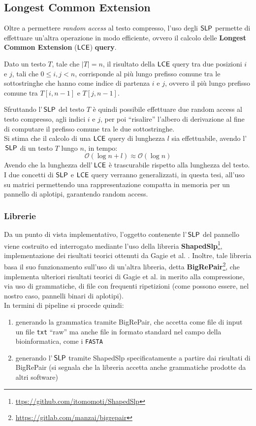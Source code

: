 \subsection{Longest Common Extension}
Oltre a permettere \textit{random access} al testo compresso, 
l'uso degli $\mbox{\rm {\sf SLP}}$ permette di effettuare 
un'altra operazione in modo efficiente, ovvero il calcolo delle \textbf{Longest
  Common Extension} ($\mbox{\rm {\sf LCE}}$) \textbf{query}.
\begin{definizione}
  Dato un testo $T$, tale che $|T|=n$, il risultato della $\mbox{\rm {\sf LCE}}$ query tra
  due posizioni $i$ e $j$, tali che $0\leq i,j<n$, corrisponde al più lungo
  prefisso comune tra le sottostringhe che hanno come indice di partenza $i$ e
  $j$, ovvero il più lungo prefisso comune tra $T[i,n-1]$ e $T[j,n-1]$.
\end{definizione}
Sfruttando l'$\,\mbox{\rm {\sf SLP}}$ del testo $T$ è quindi possibile effettuare due
random access al testo compresso, agli indici $i$ e $j$, per poi ``risalire''
l'albero di derivazione al fine di computare il prefisso comune tra le due
sottostringhe.\\ 
Si stima che il calcolo di una $\mbox{\rm {\sf LCE}}$ query di lunghezza $l$ sia
effettuabile, avendo l'$\,\mbox{\rm {\sf SLP}}$ di un testo $T$ lungo $n$, in tempo: 
\begin{equation}
  \label{eq:lcetime}
  \mathcal{O}\left(\log n+l\right)\approx\mathcal{O}\left(\log n\right)
\end{equation}
Avendo che la lunghezza dell'$\,\mbox{\rm {\sf LCE}}$ è trascurabile rispetto alla lunghezza del
testo.\\ 
I due concetti di $\mbox{\rm {\sf SLP}}$ e $\mbox{\rm {\sf LCE}}$ query verranno generalizzati, in
questa tesi, all'uso su matrici permettendo una rappresentazione compatta in
memoria per un pannello di aplotipi, garantendo random access.
\subsubsection{Librerie}
Da un punto di vista implementativo, l'oggetto contenente  l'$\,\mbox{\rm {\sf SLP}}$ del
pannello viene costruito ed interrogato mediante l'uso della libreria
\textbf{ShapedSlp}\footnote{\url{ttps://github.com/itomomoti/ShapedSlp}},
implementazione dei risultati teorici ottenuti da 
Gagie et al. \cite{slpgagie}. Inoltre, tale libreria basa il suo funzionamento
sull'uso di un'altra libreria, detta
\textbf{BigRePair}\footnote{\url{https://gitlab.com/manzai/bigrepair}}, che 
implementa ulteriori risultati teorici di Gagie et al. \cite{rpair} in merito
alla compressione, via uso di grammatiche, di file con frequenti ripetizioni
(come possono essere, nel nostro caso, pannelli binari di aplotipi).\\
In termini di pipeline si procede quindi:
\begin{enumerate}
  \item generando la grammatica tramite BigRePair, che accetta
  come file di input un file \texttt{txt} ``raw'' ma anche file in formato
  standard nel campo della bioinformatica, come i \texttt{FASTA}
  \item generando l'$\,\mbox{\rm {\sf SLP}}$ tramite ShapedSlp specificatamente a
  partire dai risultati di BigRePair (si segnala che la libreria
  accetta anche grammatiche prodotte da altri software) 
\end{enumerate}